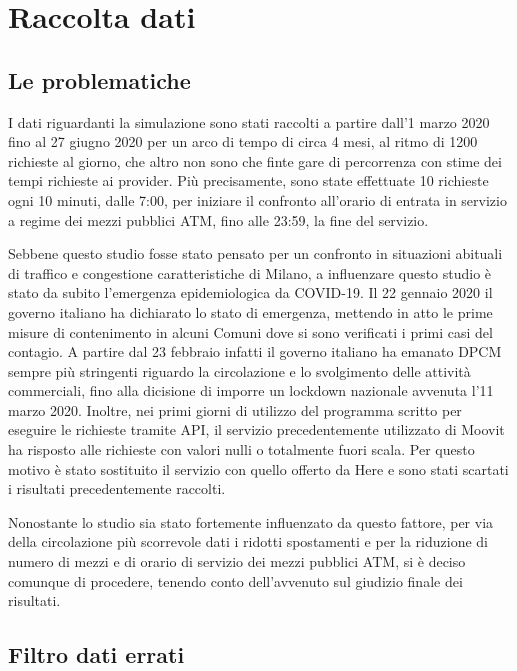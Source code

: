 \section{Raccolta dati}

\subsection{Le problematiche}

I dati riguardanti la simulazione sono stati raccolti a partire dall'1 marzo 2020 fino al 27 giugno 2020 per un arco di tempo di circa 4 mesi, al ritmo di 1200 richieste al giorno, che altro non sono che finte gare di percorrenza con stime dei tempi richieste ai provider. Più precisamente, sono state effettuate 10 richieste ogni 10 minuti, dalle 7:00, per iniziare il confronto all'orario di entrata in servizio a regime dei mezzi pubblici ATM, fino alle 23:59, la fine del servizio.

Sebbene questo studio fosse stato pensato per un confronto in situazioni abituali di traffico e congestione caratteristiche di Milano, a influenzare questo studio è stato da subito l'emergenza epidemiologica da COVID-19. Il 22 gennaio 2020 il governo italiano ha dichiarato lo stato di emergenza, mettendo in atto le prime misure di contenimento in alcuni Comuni dove si sono verificati i primi casi del contagio. A partire dal 23 febbraio infatti il governo italiano ha emanato DPCM sempre più stringenti riguardo la circolazione e lo svolgimento delle attività commerciali, fino alla dicisione di imporre un lockdown nazionale avvenuta l'11 marzo 2020\cite{misuredelgovernopercovid}. Inoltre, nei primi giorni di utilizzo del programma scritto per eseguire le richieste tramite API, il servizio precedentemente utilizzato di Moovit ha risposto alle richieste con valori nulli o totalmente fuori scala. Per questo motivo è stato sostituito il servizio con quello offerto da Here e sono stati scartati i risultati precedentemente raccolti.

Nonostante lo studio sia stato fortemente influenzato da questo fattore, per via della circolazione più scorrevole dati i ridotti spostamenti e per la riduzione di numero di mezzi e di orario di servizio dei mezzi pubblici ATM, si è deciso comunque di procedere, tenendo conto dell'avvenuto sul giudizio finale dei risultati.

\subsection{Filtro dati errati}

